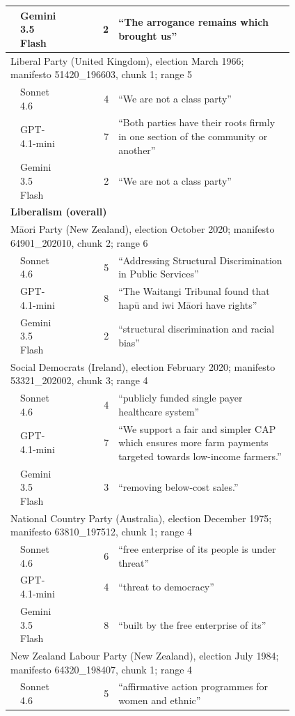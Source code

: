 {\begin{longtable}{p{0.02\linewidth}p{0.17\linewidth}rp{0.62\linewidth}}
 & Gemini 3.5 Flash & 2 & ``The arrogance remains which brought us'' \\
\midrule
\multicolumn{4}{p{0.96\linewidth}}{Liberal Party (United Kingdom), election March 1966; manifesto 51420\_196603, chunk 1; range 5} \\
 & Sonnet 4.6 & 4 & ``We are not a class party'' \\
 & GPT-4.1-mini & 7 & ``Both parties have their roots firmly in one section of the community or another'' \\
 & Gemini 3.5 Flash & 2 & ``We are not a class party'' \\
\midrule
\multicolumn{4}{l}{\textbf{Liberalism (overall)}} \\
\midrule
\multicolumn{4}{p{0.96\linewidth}}{M\={a}ori Party (New Zealand), election October 2020; manifesto 64901\_202010, chunk 2; range 6} \\
 & Sonnet 4.6 & 5 & ``Addressing Structural Discrimination in Public Services'' \\
 & GPT-4.1-mini & 8 & ``The Waitangi Tribunal found that hap\={u} and iwi M\={a}ori have rights'' \\
 & Gemini 3.5 Flash & 2 & ``structural discrimination and racial bias'' \\
\midrule
\multicolumn{4}{p{0.96\linewidth}}{Social Democrats (Ireland), election February 2020; manifesto 53321\_202002, chunk 3; range 4} \\
 & Sonnet 4.6 & 4 & ``publicly funded single payer healthcare system'' \\
 & GPT-4.1-mini & 7 & ``We support a fair and simpler CAP which ensures more farm payments targeted towards low-income farmers.'' \\
 & Gemini 3.5 Flash & 3 & ``removing below-cost sales.'' \\
\midrule
\multicolumn{4}{p{0.96\linewidth}}{National Country Party (Australia), election December 1975; manifesto 63810\_197512, chunk 1; range 4} \\
 & Sonnet 4.6 & 6 & ``free enterprise of its people is under threat'' \\
 & GPT-4.1-mini & 4 & ``threat to democracy'' \\
 & Gemini 3.5 Flash & 8 & ``built by the free enterprise of its'' \\
\midrule
\multicolumn{4}{p{0.96\linewidth}}{New Zealand Labour Party (New Zealand), election July 1984; manifesto 64320\_198407, chunk 1; range 4} \\
 & Sonnet 4.6 & 5 & ``affirmative action programmes for women and ethnic'' \\

\end{longtable}}
